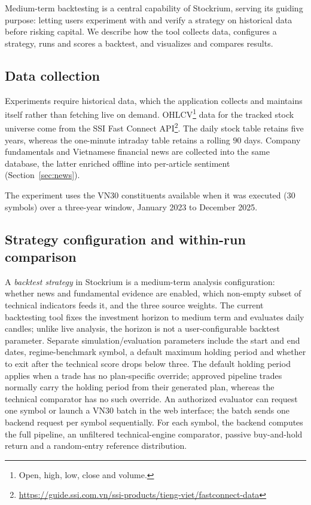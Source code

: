 \documentclass[runningheads]{llncs}
\begin{document}
Medium-term backtesting is a central capability of Stockrium, serving its guiding
purpose: letting users experiment with and verify a strategy on historical data
before risking capital. We describe how the tool collects data, configures a
strategy, runs and scores a backtest, and visualizes and compares results.

\subsection{Data collection}
Experiments require historical data, which the application collects and maintains
itself rather than fetching live on demand. OHLCV\footnote{Open, high, low, close
and volume.} data for the tracked stock universe come from the SSI Fast Connect
API\footnote{\url{https://guide.ssi.com.vn/ssi-products/tieng-viet/fastconnect-data}}.
The daily stock table retains five years, whereas the one-minute intraday table
retains a rolling $90$ days. Company fundamentals and Vietnamese financial news are
collected into the same database, the latter enriched offline into per-article
sentiment (Section~\ref{sec:news}).

The experiment uses the VN30 constituents available when it was executed ($30$
symbols) over a three-year window, January 2023 to December 2025.

\subsection{Strategy configuration and within-run comparison}
A \emph{backtest strategy} in Stockrium is a medium-term analysis configuration:
whether news and fundamental evidence are enabled, which non-empty subset of
technical indicators feeds it, and the three source weights. The current
backtesting tool fixes the investment horizon to
medium term and evaluates daily candles; unlike live analysis, the horizon is not
a user-configurable backtest parameter. Separate simulation/evaluation parameters
include the start and end dates, regime-benchmark symbol, a default maximum holding
period and whether to exit after the technical score drops below three. The default
holding period applies when a trade has no plan-specific override; approved pipeline
trades normally carry the holding period from their generated plan, whereas the
technical comparator has no such override. An authorized evaluator can request one
symbol or launch a VN30 batch in the web interface; the batch sends one backend
request per symbol sequentially. For each symbol, the backend computes the full
pipeline, an unfiltered technical-engine comparator, passive buy-and-hold return and
a random-entry reference distribution.
\end{document}
